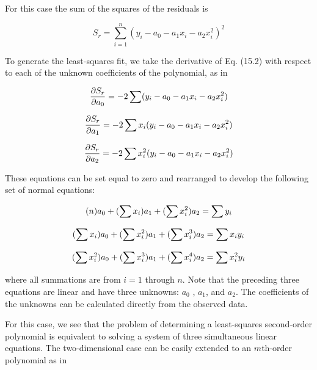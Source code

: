 \documentclass[../main.tex]{subfiles}
\begin{document}
\noindent For this case the sum of the squares of the residuals is

\begin{equation}
	\tag{15.2}
	S_r = \sum^n_{i=1}(y_i - a_0 - a_1x_i - a_2x^2_i)^2
\end{equation}

To generate the least-squares fit, we take the derivative of Eq. (15.2) with respect to each of the unknown coefficients of the polynomial, as in

\begin{equation}
	\notag
	\frac{\partial S_r}{\partial a_0} = -2 \sum (y_i -a_0 -a_1x_i - a_2x_i^2)
\end{equation}

\begin{equation}
	\notag
	\frac{\partial S_r}{\partial a_1} = -2 \sum x_i (y_i -a_0 -a_1x_i - a_2x_i^2)
\end{equation}

\begin{equation}
	\notag
	\frac{\partial S_r}{\partial a_2} = -2 \sum x_i^2 (y_i -a_0 -a_1x_i - a_2x_i^2)
\end{equation}

\noindent These equations can be set equal to zero and rearranged to develop the following set of normal equations:

\begin{equation}
	\notag
	(n)a_0 + (\sum x_i) a_1 + (\sum x^2_i) a_2 = \sum y_i
\end{equation}

\begin{equation}
	\notag
	(\sum x_i)a_0 + (\sum x_i ^ 2) a_1 + (\sum x^3_i) a_2 = \sum x_i y_i
\end{equation}

\begin{equation}
	\notag
	(\sum x_i^2)a_0 + (\sum x_i ^ 3) a_1 + (\sum x^4_i) a_2 = \sum x_i^2 y_i
\end{equation}

\noindent where all summations are from $i = 1$ through $n$. Note that the preceding three equations are linear and have three unknowns: $a_0$ , $a_1$, and $a_2$. The coefficients of the unknowns can be calculated directly from the observed data.

For this case, we see that the problem of determining a least-squares second-order polynomial is equivalent to solving a system of three simultaneous linear equations. The two-dimensional case can be easily extended to an $m$th-order polynomial as in
\end{document}
